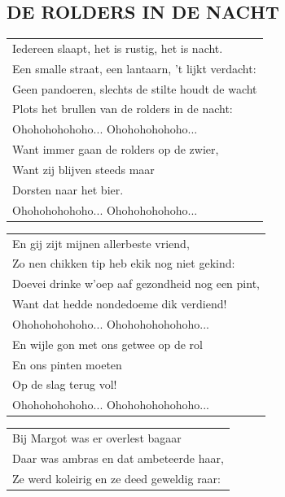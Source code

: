 \documentclass{article}
\begin{document}
\subsection*{DE ROLDERS IN DE NACHT}
\begin{flushleft}
\begin{tabularx}{0.8\textwidth} {
   >{\raggedright\arraybackslash}X}
Iedereen slaapt, het is rustig, het is nacht.\\
Een smalle straat, een lantaarn, ’t lijkt verdacht:\\
Geen pandoeren, slechts de stilte houdt de wacht\\
Plots het brullen van de rolders in de nacht:\\
Ohohohohohoho... Ohohohohohoho...\\
Want immer gaan de rolders op de zwier,\\
Want zij blijven steeds maar\\
Dorsten naar het bier.\\
Ohohohohohoho... Ohohohohohoho...\\
\end{tabularx}
\end{flushleft}\begin{flushleft}
\begin{tabularx}{0.8\textwidth} {
   >{\raggedright\arraybackslash}X}
En gij zijt mijnen allerbeste vriend,\\
Zo nen chikken tip heb ekik nog niet gekind:\\
Doevei drinke w’oep aaf gezondheid nog een pint,\\
Want dat hedde nondedoeme dik verdiend!\\
Ohohohohohoho... Ohohohohohohoho...\\
En wijle gon met ons getwee op de rol\\
En ons pinten moeten\\
Op de slag terug vol!\\
Ohohohohohoho... Ohohohohohohoho...\\
\end{tabularx}
\end{flushleft}\begin{flushleft}
\begin{tabularx}{0.8\textwidth} {
   >{\raggedright\arraybackslash}X}
Bij Margot was er overlest bagaar\\
Daar was ambras en dat ambeteerde haar,\\
Ze werd koleirig en ze deed geweldig raar:\\

\end{tabularx}
\end{flushleft}
\end{document}
